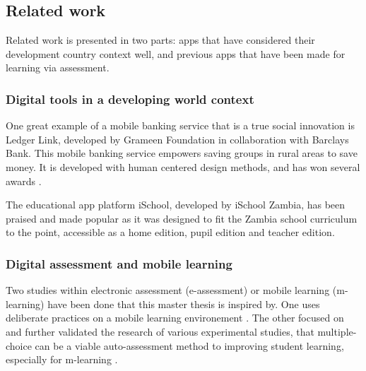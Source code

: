 \subsection{Related work}\label{sec:related-work}

Related work is presented in two parts: apps that have considered their development country context well, and previous apps that have been made for learning via assessment.

\subsubsection{Digital tools in a developing world context}

One great example of a mobile banking service that is a true social innovation is Ledger Link, developed by Grameen Foundation in collaboration with Barclays Bank. This mobile banking service empowers saving groups in rural areas to save money. It is developed with human centered design methods, and has won several awards \citep{nissar}.

The educational app platform iSchool, developed by iSchool Zambia, has been praised and made popular as it was designed to fit the Zambia school curriculum to the point, accessible as a home edition, pupil edition and teacher edition.

\subsubsection{Digital assessment and mobile learning}

Two studies within electronic assessment (e-assessment) or mobile learning (m-learning) have been done that this master thesis is inspired by. One uses deliberate practices on a mobile learning environement \citep{yengin}. The other focused on and further validated the research of various experimental studies, that multiple-choice can be a viable auto-assessment method to improving student learning, especially for m-learning \citep{de-marcos}.
